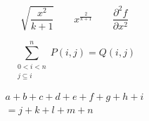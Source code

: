 \documentclass[a4paper,12pt]{article} %
\begin{document}
\begin{equation*}
\sqrt{\frac{x^2}{k+1}}\qquad
x^\frac{2}{k+1}\qquad
\frac{\partial^2f}
{\partial x^2}
\end{equation*}

\vspace{5mm}
\begin{equation*}
\sum^n_{\substack{0<i<n \\
j\subseteq i}}
P(i,j) = Q(i,j)
\end{equation*}

\vspace{5mm}
\begin{multline}
a + b + c + d + e 
+f+ g + h + i
\\
= j + k + l + m + n
\end{multline}
\end{document}
